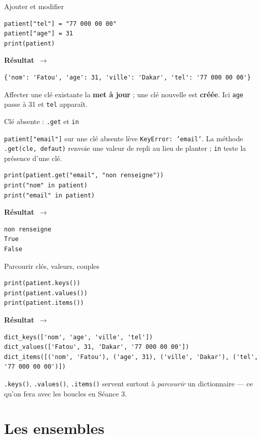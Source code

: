 \documentclass[aspectratio=169,11pt]{beamer}
\newcommand{\resultat}{{\scriptsize\textbf{R\'esultat}~$\rightarrow$}\par\vspace{1pt}}
\begin{document}
\begin{frame}[fragile]{Ajouter et modifier}
\begin{lstlisting}
patient["tel"] = "77 000 00 00"
patient["age"] = 31
print(patient)
\end{lstlisting}
\resultat
\begin{lstlisting}[style=out]
{'nom': 'Fatou', 'age': 31, 'ville': 'Dakar', 'tel': '77 000 00 00'}
\end{lstlisting}
{\small Affecter une clé existante la \textbf{met à jour} ; une clé nouvelle est \textbf{créée}. Ici \texttt{age} passe à 31 et \texttt{tel} apparaît.}
\end{frame}

\begin{frame}[fragile]{Clé absente : \texttt{.get} et \texttt{in}}
\begin{ucadpiege}
{\small \texttt{patient["email"]} sur une clé absente lève \texttt{KeyError: 'email'}. La méthode \texttt{.get(cle, defaut)} renvoie une valeur de repli au lieu de planter ; \texttt{in} teste la présence d'une clé.}
\end{ucadpiege}
\begin{lstlisting}
print(patient.get("email", "non renseigne"))
print("nom" in patient)
print("email" in patient)
\end{lstlisting}
\resultat
\begin{lstlisting}[style=out]
non renseigne
True
False
\end{lstlisting}
\end{frame}

\begin{frame}[fragile]{Parcourir clés, valeurs, couples}
\begin{lstlisting}
print(patient.keys())
print(patient.values())
print(patient.items())
\end{lstlisting}
\resultat
\begin{lstlisting}[style=out]
dict_keys(['nom', 'age', 'ville', 'tel'])
dict_values(['Fatou', 31, 'Dakar', '77 000 00 00'])
dict_items([('nom', 'Fatou'), ('age', 31), ('ville', 'Dakar'), ('tel', '77 000 00 00')])
\end{lstlisting}
{\small \texttt{.keys()}, \texttt{.values()}, \texttt{.items()} servent surtout à \emph{parcourir} un dictionnaire — ce qu'on fera avec les boucles en Séance 3.}
\end{frame}

\section{Les ensembles}
\end{document}
